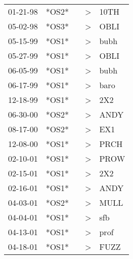 \begin{supertabular}{p{0.07\textwidth}p{0.06\textwidth}p{0.02\textwidth}p{0.02\textwidth}p{0.06\textwidth}}
          01-21-98\textsuperscript{} &  *OS2* &   &     \textgreater &           10TH\textsuperscript{} \\
          05-02-98\textsuperscript{} &  *OS3* &   &     \textgreater &           OBLI\textsuperscript{} \\
          05-15-99\textsuperscript{} &  *OS1* &   &     \textgreater &           bubh\textsuperscript{} \\
          05-27-99\textsuperscript{} &  *OS1* &   &     \textgreater &           OBLI\textsuperscript{} \\
          06-05-99\textsuperscript{} &  *OS1* &   &     \textgreater &           bubh\textsuperscript{} \\
          06-17-99\textsuperscript{} &  *OS1* &   &     \textgreater &           baro\textsuperscript{} \\
          12-18-99\textsuperscript{} &  *OS1* &   &     \textgreater &            2X2\textsuperscript{} \\
          06-30-00\textsuperscript{} &  *OS2* &   &     \textgreater &           ANDY\textsuperscript{} \\
          08-17-00\textsuperscript{} &  *OS2* &   &     \textgreater &            EX1\textsuperscript{} \\
          12-08-00\textsuperscript{} &  *OS1* &   &     \textgreater &           PRCH\textsuperscript{} \\
          02-10-01\textsuperscript{} &  *OS1* &   &     \textgreater &           PROW\textsuperscript{} \\
          02-15-01\textsuperscript{} &  *OS1* &   &     \textgreater &            2X2\textsuperscript{} \\
          02-16-01\textsuperscript{} &  *OS1* &   &     \textgreater &           ANDY\textsuperscript{} \\
          04-03-01\textsuperscript{} &  *OS2* &   &     \textgreater &           MULL\textsuperscript{} \\
          04-04-01\textsuperscript{} &  *OS1* &   &     \textgreater &            sfb\textsuperscript{} \\
          04-13-01\textsuperscript{} &  *OS1* &   &     \textgreater &           prof\textsuperscript{} \\
          04-18-01\textsuperscript{} &  *OS1* &   &     \textgreater &           FUZZ\textsuperscript{} \\

\end{supertabular}

